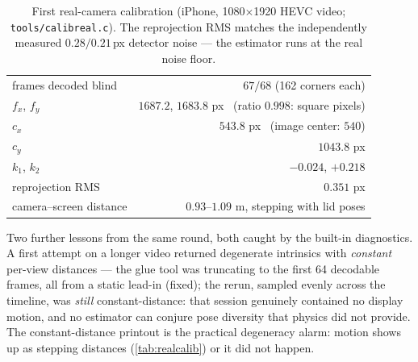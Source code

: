 \documentclass[11pt]{article}
\theoremstyle{definition}
\newcommand{\code}[1]{\texttt{#1}}
\begin{document}
\begin{table}[ht]
\centering
\begin{tabular}{lr}
\toprule
frames decoded blind & $67/68$ (162 corners each) \\
$f_x$, $f_y$ & $1687.2$, $1683.8$ px \ (ratio $0.998$: square pixels) \\
$c_x$ & $543.8$ px \ (image center: $540$) \\
$c_y$ & $1043.8$ px \\
$k_1$, $k_2$ & $-0.024$, $+0.218$ \\
reprojection RMS & $0.351$ px \\
camera--screen distance & $0.93$--$1.09$ m, stepping with lid poses \\
\bottomrule
\end{tabular}
\caption{First real-camera calibration (iPhone, 1080$\times$1920
HEVC video; \code{tools/calibreal.c}). The reprojection RMS matches
the independently measured $0.28/0.21$\,px detector noise --- the
estimator runs at the real noise floor.}
\label{tab:realcalib}
\end{table}

Two further lessons from the same round, both caught by the built-in
diagnostics. A first attempt on a longer video returned degenerate
intrinsics with \emph{constant} per-view distances --- the glue tool
was truncating to the first 64 decodable frames, all from a static
lead-in (fixed); the rerun, sampled evenly across the timeline, was
\emph{still} constant-distance: that session genuinely contained no
display motion, and no estimator can conjure pose diversity that
physics did not provide. The constant-distance printout is the
practical degeneracy alarm: motion shows up as stepping distances
(\autoref{tab:realcalib}) or it did not happen.
\end{document}
